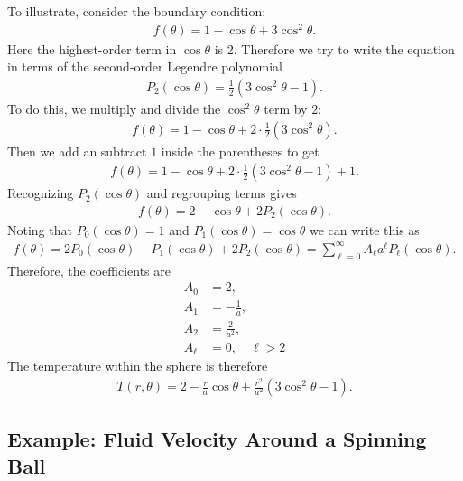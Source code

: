 To illustrate, consider the boundary condition:
\begin{align}
  f(\theta) = 1 - \cos \theta + 3 \cos^2 \theta .
\end{align}
Here the highest-order term in $\cos \theta$ is 2. Therefore we try to write the equation in terms of the second-order Legendre polynomial
\begin{align}
   P_2(\cos \theta) = \frac{1}{2} \left( 3 \cos^2 \theta - 1 \right) . \nonumber
\end{align}
To do this, we multiply and divide the $\cos^2 \theta$ term by $2$:
\begin{align}
  f(\theta) = 1 - \cos \theta + 2 \cdot \frac{1}{2} \left( 3 \cos^2 \theta \right) . \nonumber
\end{align}
Then we add an subtract $1$ inside the parentheses to get 
\begin{align}
  f(\theta) = 1 - \cos \theta + 2 \cdot \frac{1}{2} \left( 3 \cos^2 \theta - 1  \right) + 1. \nonumber
\end{align}
Recognizing $P_2(\cos \theta)$ and regrouping terms gives
\begin{align}
  f(\theta) = 2 - \cos \theta + 2 P_2( \cos \theta ). \nonumber
\end{align}
Noting that $P_0(\cos \theta) = 1$ and $P_1(\cos \theta) = \cos \theta$ we can write this as
\begin{align}
  f(\theta) = 2 P_0( \cos \theta) - P_1( \cos \theta)  + 2 P_2( \cos \theta ) =  \sum_{\ell = 0}^\infty A_\ell a^\ell P_\ell( \cos \theta ) .
\end{align}
Therefore, the coefficients are
\begin{subequations}
\begin{align}
  A_0 &= 2, \\
  A_1 &= -\frac{1}{a}, \\
  A_2 &= \frac{2}{a^2}, \\
  A_\ell &= 0, \quad \ell > 2
\end{align}
\end{subequations}
The temperature within the sphere is therefore
\begin{align}
  T(r,\theta) = 2 - \frac{r}{a} \cos \theta + \frac{r^2}{a^2} \left( 3 \cos^2 \theta - 1 \right) .
\end{align}


\subsection{Example: Fluid Velocity Around a Spinning Ball}

